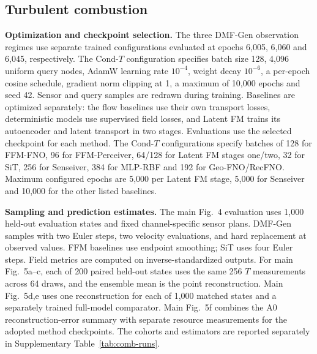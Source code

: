 \documentclass[11pt]{article}
\newcommand{\sisubsection}[1]{%
\FloatBarrier
\Needspace{5\baselineskip}%
\subsection{#1}%
}
\newcommand{\detail}[1]{\par\Needspace{4\baselineskip}\textbf{#1}\enspace}
\begin{document}
\sisubsection{Turbulent combustion}
\label{subsec:train-combustion}
\detail{Optimization and checkpoint selection.}
{
The three DMF-Gen observation regimes use separate trained configurations evaluated at epochs 6,005, 6,060 and 6,045, respectively. The Cond-$T$ configuration specifies batch size 128, 4,096 uniform query nodes, AdamW learning rate $10^{-4}$, weight decay $10^{-6}$, a per-epoch cosine schedule, gradient norm clipping at 1, a maximum of 10,000 epochs and seed 42. Sensor and query samples are redrawn during training. Baselines are optimized separately: the flow baselines use their own transport losses, deterministic models use supervised field losses, and Latent FM trains its autoencoder and latent transport in two stages. Evaluations use the selected checkpoint for each method. The Cond-$T$ configurations specify batches of 128 for FFM-FNO, 96 for FFM-Perceiver, 64/128 for Latent FM stages one/two, 32 for SiT, 256 for Senseiver, 384 for MLP-RBF and 192 for Geo-FNO/RecFNO. Maximum configured epochs are 5,000 per Latent FM stage, 5,000 for Senseiver and 10,000 for the other listed baselines.
}
\detail{Sampling and prediction estimates.}
{
The main Fig.~4 evaluation uses 1,000 held-out evaluation states and fixed channel-specific sensor plans. DMF-Gen samples with two Euler steps, two velocity evaluations, and hard replacement at observed values. FFM baselines use endpoint smoothing; SiT uses four Euler steps. Field metrics are computed on inverse-standardized outputs. For main Fig.~5a--c, each of 200 paired held-out states uses the same 256 $T$ measurements across 64 draws, and the ensemble mean is the point reconstruction. Main Fig.~5d,e uses one reconstruction for each of 1,000 matched states and a separately trained full-model comparator. Main Fig.~5f combines the A0 reconstruction-error summary with separate resource measurements for the adopted method checkpoints. The cohorts and estimators are reported separately in Supplementary Table~\ref{tab:comb-runs}.
}
\end{document}
